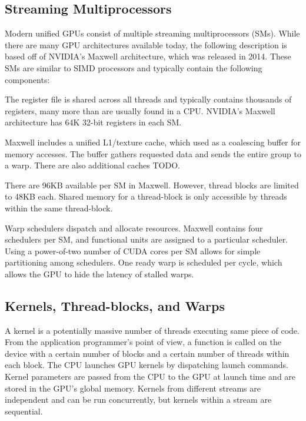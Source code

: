 \documentclass[prodmode,acmtecs]{acmsmall} %
\begin{document}
\subsection{Streaming Multiprocessors}
Modern unified GPUs consist of multiple streaming multiprocessors (SMs). While
there are many GPU architectures available today, the following description is
based off of NVIDIA's Maxwell architecture, which was released in 2014. These
SMs are similar to SIMD processors and typically contain the following
components:
\begin{description}
  \setlength\itemsep{1em}
  \item[A large register file] The register file is shared across all threads
  and typically contains thousands of registers, many more than are usually
  found in a CPU. NVIDIA's Maxwell architecture has 64K 32-bit registers in each
  SM.
  \item[Multiple caches] Maxwell includes a unified L1/texture cache, which used
  as a coalescing buffer for memory accesses. The buffer gathers requested data
  and sends the entire group to a warp. There are also additional caches TODO.
  \item[Shared memory] There are 96KB available per SM in Maxwell. However,
  thread blocks are limited to 48KB each. Shared memory for a thread-block is
  only accessible by threads within the same thread-block.
  \item[Multiple warp schedulers] Warp schedulers dispatch and allocate
  resources. Maxwell contains four schedulers per SM, and functional units are
  assigned to a particular scheduler. Using a power-of-two number of CUDA cores
  per SM allows for simple partitioning among schedulers. One ready warp is
  scheduled per cycle, which allows the GPU to hide the latency of stalled
  warps.
\end{description}

\subsection{Kernels, Thread-blocks, and Warps}
A kernel is a potentially massive number of threads executing same piece of
code. From the application programmer's point of view, a function is called on
the device with a certain number of blocks and a certain number of threads
within each block. The CPU launches GPU kernels by dispatching launch commands.
Kernel parameters are passed from the CPU to the GPU at launch time and are
stored in the GPU's global memory. Kernels from different streams are
independent and can be run concurrently, but kernels within a stream are
sequential.
\end{document}
